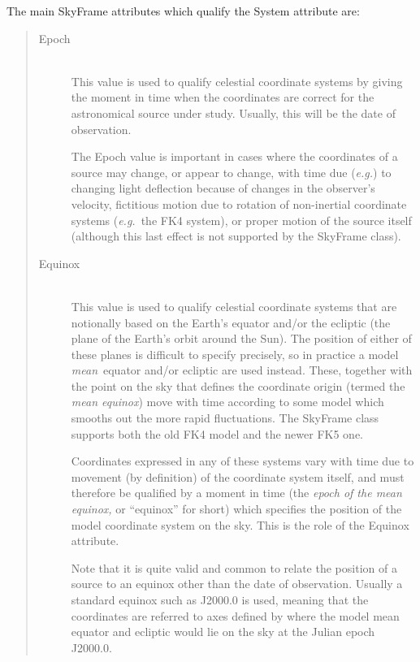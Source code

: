 \documentclass[twoside,11pt]{article}
\begin{document}
The main SkyFrame attributes which qualify the System attribute are:

\begin{quote}
\begin{description}
\item[Epoch]\mbox{}\\
This value is used to qualify celestial coordinate systems by giving
the moment in time when the coordinates are correct for the
astronomical source under study. Usually, this will be the date of
observation.

The Epoch value is important in cases where the coordinates of a
source may change, or appear to change, with time due ({\em{e.g.}}) to
changing light deflection because of changes in the observer's
velocity, fictitious motion due to rotation of non-inertial coordinate
systems ({\em{e.g.}}\ the FK4 system), or proper motion of the source
itself (although this last effect is not supported by the SkyFrame
class).

\item[\label{ss:equinoxitem}Equinox]\mbox{}\\
This value is used to qualify celestial coordinate systems that are
notionally based on the Earth's equator and/or the ecliptic (the plane
of the Earth's orbit around the Sun). The position of either of these
planes is difficult to specify precisely, so in practice a model
{\em{mean}}\ equator and/or ecliptic are used instead. These, together
with the point on the sky that defines the coordinate origin (termed
the {\em{mean equinox}}) move with time according to some model which
smooths out the more rapid fluctuations. The SkyFrame class supports
both the old FK4 model and the newer FK5 one.

Coordinates expressed in any of these systems vary with time due to
movement (by definition) of the coordinate system itself, and must
therefore be qualified by a moment in time (the {\em{epoch of the mean
equinox,}} or ``equinox'' for short) which specifies the position of
the model coordinate system on the sky. This is the role of the
Equinox attribute.

Note that it is quite valid and common to relate the position of a
source to an equinox other than the date of observation. Usually a
standard equinox such as J2000.0 is used, meaning that the coordinates
are referred to axes defined by where the model mean equator and
ecliptic would lie on the sky at the Julian epoch J2000.0.
\end{description}
\end{quote}
\end{document}
